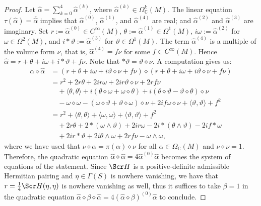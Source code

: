 \documentclass[10pt,a4paper,twoside,reqno]{amsart}
\theoremstyle{plain}
\theoremstyle{definition}
\theoremstyle{remark}
\def\C{\mathbb{C}}
\def\scS{\Scr H}
\newcommand{\escal}[1]{\langle#1\rangle}
\begin{document}
\begin{proof}
    Let $\widehat{\alpha}=\sum_{k=0}^4\widehat{\alpha}^{(k)}$, where $\widehat{\alpha}^{(k)}\in\Omega^k_\C(M)$. The linear equation $\tau(\widehat{\alpha})=\overline{\widehat{\alpha}}$ implies that $\widehat{\alpha}^{(0)}$, $\widehat{\alpha}^{(1)}$, and $\widehat{\alpha}^{(4)}$ are real; and $\widehat{\alpha}^{(2)}$ and $\widehat{\alpha}^{(3)}$ are imaginary. Set $r:=\widehat{\alpha}^{(0)}\in C^\infty(M)$, $\theta:=\widehat{\alpha}^{(1)}\in\Omega^1(M)$, $i\omega:=\widehat{\alpha}^{(2)}$ for $\omega\in\Omega^2(M)$, and $i*\vartheta:=\widehat{\alpha}^{(3)}$ for $\vartheta\in\Omega^1(M)$. The term $\widehat{\alpha}^{(4)}$ is a multiple of the volume form $\nu$, that is, $\widehat{\alpha}^{(4)}=f\nu$ for some $f\in C^\infty(M)$. Hence $\widehat{\alpha}=r+\theta+i\omega+i*\vartheta+f\nu$. Note that $*\vartheta=\vartheta\diamond\nu$. A computation gives us: \begin{align*}
        \widehat{\alpha}\diamond\widehat{\alpha}&=(r+\theta+i\omega+i\vartheta\diamond\nu+f\nu)\diamond(r+\theta+i\omega+i\vartheta\diamond\nu+f\nu)\\
        &=r^2+2r\theta+2ir\omega+2ir\vartheta\diamond\nu+2rf\nu\\
        &\quad+\escal{\theta,\theta}+i(\theta\diamond\omega+\omega\diamond\theta)+i(\theta\diamond\vartheta-\vartheta\diamond\theta)\diamond\nu\\
        &\quad-\omega\diamond\omega-(\omega\diamond\vartheta+\vartheta\diamond\omega)\diamond\nu+2if\omega\diamond\nu+\escal{\vartheta,\vartheta}+f^2\\
        &=r^2+\escal{\theta,\theta}+\escal{\omega,\omega}+\escal{\vartheta,\vartheta}+f^2\\
        &\quad+2r\theta+2*(\omega\wedge\vartheta)+2ir\omega-2i*(\theta\wedge\vartheta)-2if*\omega\\
        &\quad+2ir*\vartheta+2i\theta\wedge\omega+2rf\nu-\omega\wedge\omega,
    \end{align*} where we have used that $\nu\diamond\alpha=\pi(\alpha)\diamond\nu$ for all $\alpha\in\Omega_\C(M)$ and $\nu\diamond\nu=1$. Therefore, the quadratic equation $\widehat{\alpha}\diamond\widehat{\alpha}=4\widehat{\alpha}^{(0)}\widehat{\alpha}$ becomes the system of equations of the statement. Since $\scS$ is a positive-definite admissible Hermitian pairing and $\eta\in\Gamma(S)$ is nowhere vanishing, we have that $r=\frac{1}{4}\scS(\eta,\eta)$ is nowhere vanishing as well, thus it suffices to take $\beta=1$ in the quadratic equation $\widehat{\alpha}\diamond\beta\diamond\widehat{\alpha}=4(\widehat{\alpha}\diamond\beta)^{(0)}\widehat{\alpha}$ to conclude.
\end{proof}
\end{document}
